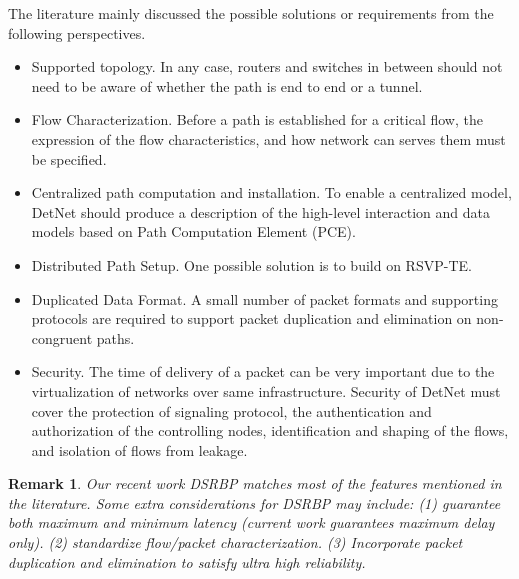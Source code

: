\documentclass[12pt]{article}
\newtheorem*{remark}{Remark}
\begin{document}
The literature mainly discussed the possible solutions or requirements from the following perspectives.
\begin{itemize}
    \item Supported topology.  In any case, routers
 and switches in between should not need to be aware of whether the path is end to end or a tunnel.
    \item Flow Characterization. Before a path is established for a critical flow, the expression of the flow characteristics, and how network can serves them must be specified.
    \item Centralized path computation and installation. To enable a centralized model, DetNet should produce a description of the high-level interaction and data models based on Path  Computation Element (PCE). 
    \item Distributed Path Setup. One possible solution is to build on RSVP-TE.
    \item Duplicated Data Format. A small  number of packet formats and supporting protocols are required to support packet duplication and elimination on non-congruent paths.
    \item Security. The time of delivery of a packet can be very important due to the virtualization of networks over same infrastructure. Security of DetNet must cover the protection of signaling protocol, the authentication and authorization of the controlling nodes, identification and shaping of the flows, and isolation of flows from leakage.
\end{itemize}

\begin{remark}
Our recent work DSRBP matches most of the features mentioned in the literature. Some extra considerations for DSRBP may include: (1) guarantee both maximum and minimum latency (current work guarantees maximum delay only). (2) standardize flow/packet characterization. (3) Incorporate packet duplication and elimination to satisfy ultra high reliability.
\end{remark}
\end{document}
